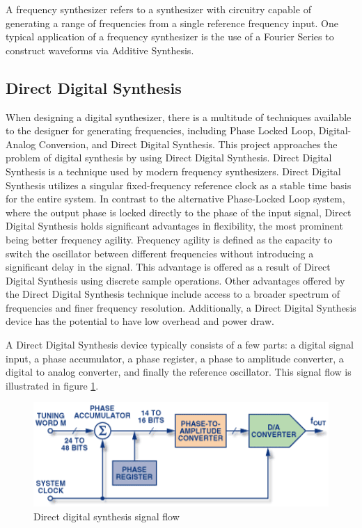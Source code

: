 \documentclass[a4paper,12pt]{report}
\begin{document}
A frequency synthesizer refers to a synthesizer with circuitry capable of generating a range of frequencies from a single reference frequency input. One typical application of a frequency synthesizer is the use of a Fourier Series to construct waveforms via Additive Synthesis.

\subsection{Direct Digital Synthesis}
\label{subsec:directdigitalsynth}
When designing a digital synthesizer, there is a multitude of techniques available to the designer for generating frequencies, including Phase Locked Loop, Digital-Analog Conversion, and Direct Digital Synthesis. This project approaches the problem of digital synthesis by using Direct Digital Synthesis. Direct Digital Synthesis is a technique used by modern frequency synthesizers. Direct Digital Synthesis utilizes a singular fixed-frequency reference clock as a stable time basis for the entire system. In contrast to the alternative Phase-Locked Loop system, where the output phase is locked directly to the phase of the input signal, Direct Digital Synthesis holds significant advantages in flexibility, the most prominent being better frequency agility. Frequency agility is defined as the capacity to switch the oscillator between different frequencies without introducing a significant delay in the signal. This advantage is offered as a result of Direct Digital Synthesis using discrete sample operations. Other advantages offered by the Direct Digital Synthesis technique include access to a broader spectrum of frequencies and finer frequency resolution. Additionally, a Direct Digital Synthesis device has the potential to have low overhead and power draw.

A Direct Digital Synthesis device typically consists of a few parts: a digital signal input, a phase accumulator, a phase register, a phase to amplitude converter, a digital to analog converter, and finally the reference oscillator. This signal flow is illustrated in figure \ref{fig:dds}.

\begin{figure}
    \centering
    \includegraphics[width=36em]{DDS.png}
    \caption{Direct digital synthesis signal flow}
    \label{fig:dds}
\end{figure}
\end{document}

